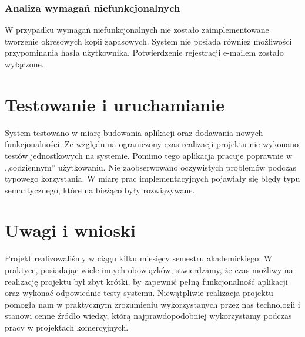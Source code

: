 \documentclass[12pt,a4paper,oneside]{article}
\begin{document}
\subsubsection{Analiza wymagań niefunkcjonalnych}
W przypadku wymagań niefunkcjonalnych nie zostało zaimplementowane tworzenie
okresowych kopii zapasowych. System nie posiada również możliwości przypominania
hasła użytkownika. Potwierdzenie rejestracji e-mailem zostało wyłączone.

\section{Testowanie i uruchamianie}
System testowano w miarę budowania aplikacji oraz dodawania nowych
funkcjonalności. Ze względu na ograniczony czas realizacji projektu nie
wykonano testów jednostkowych na systemie. Pomimo tego aplikacja pracuje
poprawnie w ,,codziennym'' użytkowaniu. Nie zaobserwowano oczywistych problemów
podczas typowego korzystania. W miarę prac implementacyjnych pojawiały się błędy
typu semantycznego, które na bieżąco były rozwiązywane.

\section{Uwagi i wnioski}
Projekt realizowaliśmy w ciągu kilku miesięcy semestru akademickiego. W praktyce,
posiadając wiele innych obowiązków, stwierdzamy, że czas możliwy na realizację
projektu był zbyt krótki, by zapewnić pełną funkcjonalność aplikacji oraz wykonać
odpowiednie testy systemu. Niewątpliwie realizacja projektu pomogła nam w 
praktycznym zrozumieniu wykorzystanych przez nas technologii i stanowi cenne 
źródło wiedzy, którą najprawdopodobniej wykorzystamy podczas pracy w projektach
komercyjnych.
\end{document}
